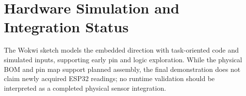 \section{Hardware Simulation and Integration Status}
The Wokwi sketch models the embedded direction with task-oriented code and simulated inputs, supporting early pin and logic exploration. While the physical BOM and pin map support planned assembly, the final demonstration does not claim newly acquired ESP32 readings; no runtime validation should be interpreted as a completed physical sensor integration.
